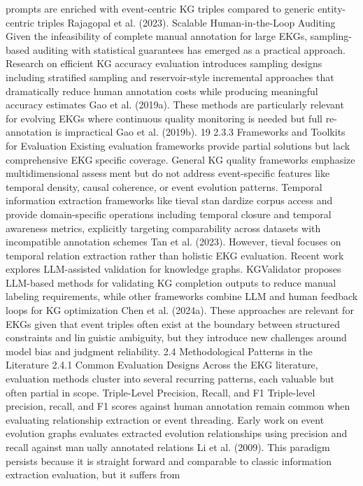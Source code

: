 prompts are enriched with event-centric KG triples compared to generic entity-centric
triples Rajagopal et al. (2023).
Scalable Human-in-the-Loop Auditing
Given the infeasibility of complete manual annotation for large EKGs, sampling-based
auditing with statistical guarantees has emerged as a practical approach. Research on
efficient KG accuracy evaluation introduces sampling designs including stratified sampling
and reservoir-style incremental approaches that dramatically reduce human annotation
costs while producing meaningful accuracy estimates Gao et al. (2019a). These methods
are particularly relevant for evolving EKGs where continuous quality monitoring is needed
but full re-annotation is impractical Gao et al. (2019b).
19
2.3.3 Frameworks and Toolkits for Evaluation
Existing evaluation frameworks provide partial solutions but lack comprehensive EKGspecific coverage. General KG quality frameworks emphasize multidimensional assessment but do not address event-specific features like temporal density, causal coherence,
or event evolution patterns. Temporal information extraction frameworks like tieval standardize corpus access and provide domain-specific operations including temporal closure
and temporal awareness metrics, explicitly targeting comparability across datasets with
incompatible annotation schemes Tan et al. (2023). However, tieval focuses on temporal
relation extraction rather than holistic EKG evaluation.
Recent work explores LLM-assisted validation for knowledge graphs. KGValidator
proposes LLM-based methods for validating KG completion outputs to reduce manual
labeling requirements, while other frameworks combine LLM and human feedback loops
for KG optimization Chen et al. (2024a). These approaches are relevant for EKGs given
that event triples often exist at the boundary between structured constraints and linguistic ambiguity, but they introduce new challenges around model bias and judgment
reliability.
2.4 Methodological Patterns in the Literature
2.4.1 Common Evaluation Designs
Across the EKG literature, evaluation methods cluster into several recurring patterns,
each valuable but often partial in scope.
Triple-Level Precision, Recall, and F1
Triple-level precision, recall, and F1 scores against human annotation remain common
when evaluating relationship extraction or event threading. Early work on event evolution
graphs evaluates extracted evolution relationships using precision and recall against manually annotated relations Li et al. (2009). This paradigm persists because it is straightforward and comparable to classic information extraction evaluation, but it suffers from
